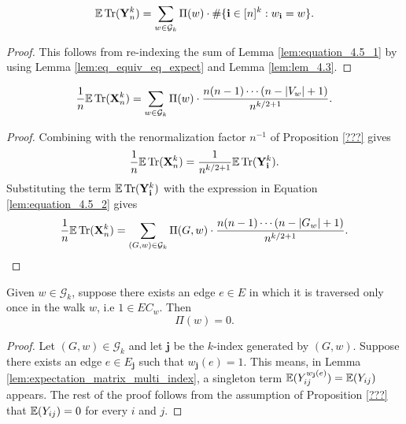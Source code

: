 \begin{lemma}
  \label{lem:equation_4.5_2}
  \[
  \mathbb{E} \operatorname{Tr} (\mathbf{Y}_n^k) = \sum_{w \in \mathcal{G}_k} \Pi (w) \cdot \# \{ \mathbf{i} \in [n]^k : w_\mathbf{i} = w \}.
  \]
\end{lemma}

\begin{proof}
  This follows from re-indexing the sum of Lemma \ref{lem:equation_4.5_1} by using Lemma \ref{lem:eq_equiv_eq_expect} and Lemma \ref{lem:lem_4.3}.
\end{proof}


\begin{lemma}
  \label{lem:equation_4.5_3}
  \[
  \frac{1}{n} \mathbb{E} \operatorname{Tr} (\mathbf{X}_n^k) = \sum_{w \in \mathcal{G}_k} \Pi (w) \cdot \frac{n (n-1) \cdots (n - |V_w| + 1)}{n^{k/2+1}}.
  \]
\end{lemma}

\begin{proof}
  Combining with the renormalization factor $n^{-1}$ of Proposition \ref{???} gives
  \[
  \frac{1}{n} \mathbb{E} \operatorname{Tr} (\mathbf{X}_n^k) = \frac{1}{n^{k/2+1}} \mathbb{E} \operatorname{Tr} (\mathbf{Y}_\mathbf{i}^k).
  \]
  Substituting the term $\mathbb{E} \operatorname{Tr} (\mathbf{Y}_\mathbf{i}^k)$ with the expression in Equation \ref{lem:equation_4.5_2} gives
  \[
  \frac{1}{n} \mathbb{E} \operatorname{Tr} (\mathbf{X}_n^k) = \sum_{\substack{(G,w) \in \mathcal{G}_k}} \Pi (G,w) \cdot \frac{n (n-1) \cdots (n - |G_w| + 1)}{n^{k/2+1}}.
  \]
\end{proof}


\begin{lemma}[$\Pi (G,w) = 0$ : R-1-15 : lem:Pi.prod\_eq\_zero\_if\_w\_le\_two]
  \label{lem:Pi.prod_eq_zero_if_w_le_two}
  Given $w \in \mathcal{G}_k$, suppose there exists an edge $e \in E$ in which it is traversed only
  once in the walk $w$, i.e $1 \in EC_w$. Then
  \[
  \Pi (w) = 0.
  \]
\end{lemma}

\begin{proof}
  Let $(G,w) \in \mathcal{G}_k$ and let $\mathbf{j}$ be the $k$-index generated by $(G,w)$. Suppose there exists an edge $e \in E_\mathbf{j}$ such that $w_\mathbf{j}(e) = 1$.
  This means, in Lemma \ref{lem:expectation_matrix_multi_index}, a singleton term $\mathbb{E} (Y_{ij}^{w_\mathbf{j}(e)}) = \mathbb{E} (Y_{ij})$ appears.
  The rest of the proof follows from the assumption of Proposition \ref{???} that $\mathbb{E} (Y_{ij}) = 0$ for every $i$ and $j$.
\end{proof}


